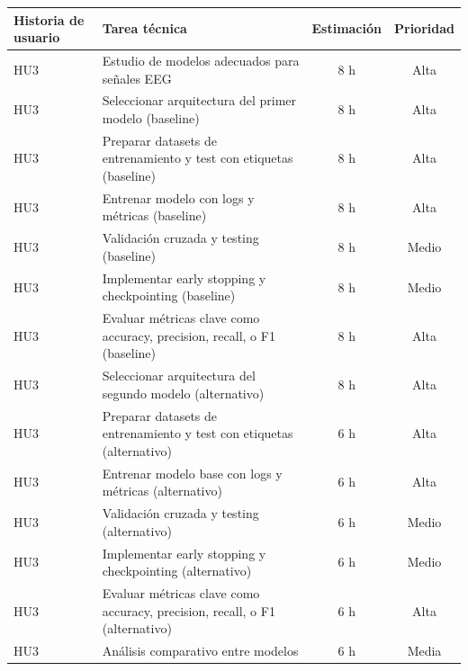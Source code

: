 \documentclass[
11pt, %
]{charter}
\begin{document}
\begin{table}[htpb]
\begin{tabularx}{\linewidth}{@{}|X|X|c|c|@{}}
\end{tabularx}
\end{table}

\begin{table}[htpb]
\centering
\begin{tabularx}{\linewidth}{@{}|X|X|c|c|@{}}
\hline
\rowcolor[HTML]{C0C0C0}
Historia de usuario & Tarea técnica & Estimación & Prioridad \\ \hline
HU3 & Estudio de modelos adecuados para señales EEG					 & 8 h & Alta \\ \hline
HU3 & Seleccionar arquitectura del primer modelo (baseline)					 & 8 h & Alta \\ \hline
HU3 & Preparar datasets de entrenamiento y test con etiquetas (baseline)					 & 8 h & Alta \\ \hline
HU3 & Entrenar modelo con logs y métricas	 (baseline)					 & 8 h & Alta \\ \hline
HU3 & Validación cruzada y testing (baseline)			 & 8 h & Medio \\ \hline
HU3 & Implementar early stopping y checkpointing	 (baseline)			 & 8 h & Medio \\ \hline
HU3 & Evaluar métricas clave como accuracy, precision, recall, o F1 (baseline)					 & 8 h & Alta \\ \hline
HU3 & Seleccionar arquitectura del segundo modelo  (alternativo)					 & 8 h & Alta \\ \hline
HU3 & Preparar datasets de entrenamiento y test con etiquetas (alternativo)					 & 6 h & Alta \\ \hline
HU3 & Entrenar modelo base con logs y métricas	 (alternativo)					 & 6 h & Alta \\ \hline
HU3 & Validación cruzada y testing (alternativo)			 & 6 h & Medio \\ \hline
HU3 & Implementar early stopping y checkpointing	 (alternativo)			 & 6 h & Medio \\ \hline
HU3 & Evaluar métricas clave como accuracy, precision, recall, o F1 (alternativo)					 & 6 h & Alta \\ \hline
HU3 & Análisis comparativo entre modelos				 & 6 h & Media \\ \hline


\end{tabularx}
\end{table}
\end{document}
